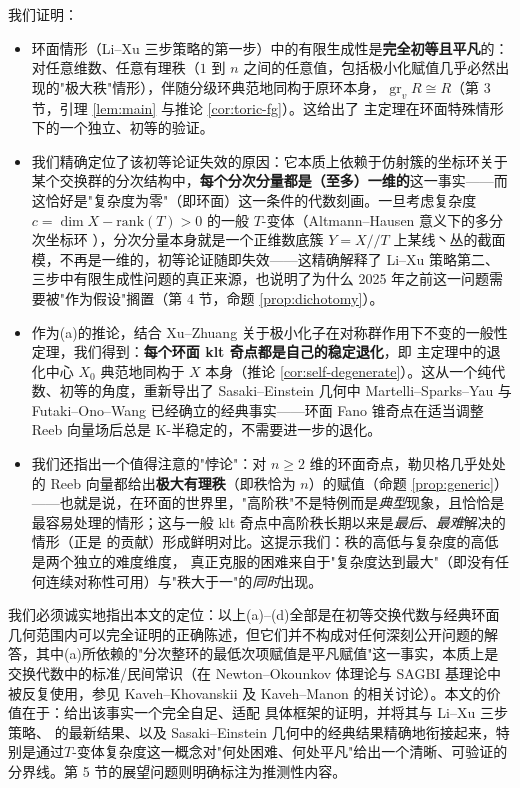 \documentclass[11pt,a4paper]{article}
\theoremstyle{definition}
\theoremstyle{remark}
\DeclareMathOperator{\gr}{gr}
\begin{document}
我们证明：
\begin{itemize}[leftmargin=1.6em]
  \item[(a)] 环面情形（Li--Xu 三步策略的第一步）中的有限生成性是\textbf{完全初等且平凡}的：对任意维数、任意有理秩（$1$ 到 $n$ 之间的任意值，包括极小化赋值几乎必然出现的"极大秩"情形），伴随分级环典范地同构于原环本身，$\gr_v R\cong R$（第 3 节，引理 \ref{lem:main} 与推论 \ref{cor:toric-fg}）。这给出了 \cite{XZ2025} 主定理在环面特殊情形下的一个独立、初等的验证。

  \item[(b)] 我们精确定位了该初等论证失效的原因：它本质上依赖于仿射簇的坐标环关于某个交换群的分次结构中，\textbf{每个分次分量都是（至多）一维的}这一事实——而这恰好是"复杂度为零"（即环面）这一条件的代数刻画。一旦考虑复杂度 $c=\dim X-\mathrm{rank}(T)>0$ 的一般 $T$-变体（Altmann--Hausen 意义下的多分次坐标环 \cite{AH2006}），分次分量本身就是一个正维数底簇 $Y=X/\!\!/T$ 上某线丶丛的截面模，不再是一维的，初等论证随即失效——这精确解释了 Li--Xu 策略第二、三步中有限生成性问题的真正来源，也说明了为什么 2025 年之前这一问题需要被"作为假设"搁置（第 4 节，命题 \ref{prop:dichotomy}）。

  \item[(c)] 作为(a)的推论，结合 Xu--Zhuang \cite{XZ2021} 关于极小化子在对称群作用下不变的一般性定理，我们得到：\textbf{每个环面 klt 奇点都是自己的稳定退化}，即 \cite{XZ2025} 主定理中的退化中心 $X_0$ 典范地同构于 $X$ 本身（推论 \ref{cor:self-degenerate}）。这从一个纯代数、初等的角度，重新导出了 Sasaki--Einstein 几何中 Martelli--Sparks--Yau \cite{MSY2008} 与 Futaki--Ono--Wang \cite{FOW2009} 已经确立的经典事实——环面 Fano 锥奇点在适当调整 Reeb 向量场后总是 K-半稳定的，不需要进一步的退化。

  \item[(d)] 我们还指出一个值得注意的"悖论"：对 $n\ge2$ 维的环面奇点，勒贝格几乎处处的 Reeb 向量都给出\textbf{极大有理秩}（即秩恰为 $n$）的赋值（命题 \ref{prop:generic}）——也就是说，在环面的世界里，"高阶秩"不是特例而是\emph{典型}现象，且恰恰是最容易处理的情形；这与一般 klt 奇点中高阶秩长期以来是\emph{最后、最难}解决的情形（正是 \cite{XZ2025} 的贡献）形成鲜明对比。这提示我们：秩的高低与复杂度的高低是两个独立的难度维度，\cite{XZ2025} 真正克服的困难来自于"复杂度达到最大"（即没有任何连续对称性可用）与"秩大于一"的\emph{同时}出现。
\end{itemize}

我们必须诚实地指出本文的定位：以上(a)--(d)全部是在初等交换代数与经典环面几何范围内可以完全证明的正确陈述，但它们并不构成对任何深刻公开问题的解答，其中(a)所依赖的"分次整环的最低次项赋值是平凡赋值"这一事实，本质上是交换代数中的标准/民间常识（在 Newton--Okounkov 体理论与 SAGBI 基理论中被反复使用，参见 Kaveh--Khovanskii \cite{KK2012} 及 Kaveh--Manon \cite{KM2019} 的相关讨论）。本文的价值在于：给出该事实一个完全自足、适配 \cite{XZ2025} 具体框架的证明，并将其与 Li--Xu 三步策略、\cite{XZ2025} 的最新结果、以及 Sasaki--Einstein 几何中的经典结果精确地衔接起来，特别是通过$T$-变体复杂度这一概念对"何处困难、何处平凡"给出一个清晰、可验证的分界线。第 5 节的展望问题则明确标注为推测性内容。
\end{document}
